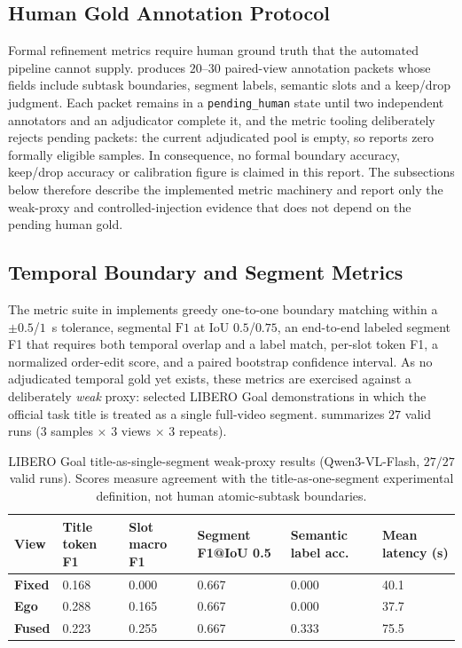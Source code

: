 \documentclass[11pt,oneside]{report}
\begin{document}
\subsection{Human Gold Annotation Protocol}
Formal refinement metrics require human ground truth that the automated pipeline
cannot supply.  produces
$20$--$30$ paired-view annotation packets whose fields include subtask
boundaries, segment labels, semantic slots and a keep/drop judgment. Each packet
remains in a \texttt{pending\_human} state until two independent annotators and
an adjudicator complete it, and the metric tooling deliberately rejects pending
packets: the current adjudicated pool is empty, so
 reports zero formally eligible
samples. In consequence, no formal boundary accuracy, keep/drop accuracy or
calibration figure is claimed in this report. The subsections below therefore
describe the implemented metric machinery and report only the weak-proxy and
controlled-injection evidence that does not depend on the pending human gold.

\subsection{Temporal Boundary and Segment Metrics}
The metric suite in  implements greedy
one-to-one boundary matching within a $\pm0.5$/$1$~s tolerance, segmental
$\text{F1}$ at IoU $0.5$/$0.75$, an end-to-end labeled segment F1 that requires
both temporal overlap and a label match, per-slot token F1, a normalized
order-edit score, and a paired bootstrap confidence interval. As no adjudicated
temporal gold yet exists, these metrics are exercised against a deliberately
\emph{weak} proxy: selected LIBERO Goal demonstrations in which the official task
title is treated as a single full-video segment. 
summarizes $27$ valid runs ($3$ samples $\times$ $3$ views $\times$ $3$ repeats).

\begin{table}[htbp]
\centering
\caption{LIBERO Goal title-as-single-segment weak-proxy results (Qwen3-VL-Flash,
$27/27$ valid runs). Scores measure agreement with the title-as-one-segment
experimental definition, not human atomic-subtask boundaries.}
\label{tab:libero-title}
\begin{tabularx}{\textwidth}{>{\bfseries}l *{5}{Y}}
\toprule
View & Title token F1 & Slot macro F1 & Segment F1\newline @IoU 0.5 & Semantic label acc. & Mean latency (s) \\
\midrule
Fixed & 0.168 & 0.000 & 0.667 & 0.000 & 40.1 \\
Ego   & 0.288 & 0.165 & 0.667 & 0.000 & 37.7 \\
Fused & 0.223 & 0.255 & 0.667 & 0.333 & 75.5 \\
\bottomrule
\end{tabularx}
\end{table}
\end{document}
